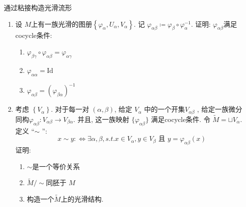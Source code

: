 \documentclass[../main.tex]{subfiles}
\begin{document}
\begin{exercise}{通过粘接构造光滑流形}{}
    \begin{enumerate}
        \item 设 \(  M  \)上有一族光滑的图册\(  \left\{  \varphi _{\alpha },U_{\alpha },V_{ \alpha } \right\}  \). 记 \(   \varphi _{ \alpha \beta }\coloneqq  \varphi _{\beta }\circ  \varphi _{\alpha }^{-1}   \). 证明: \(   \varphi _{\alpha \beta }  \)满足cocycle条件:
        \begin{enumerate}
            \item \(   \varphi _{\beta  \gamma }\circ  \varphi _{\alpha \beta }=  \varphi _{ \alpha  \gamma }  \)
            \item \(   \varphi _{\alpha  \alpha }= \mathrm{Id}  \)
            \item \(   \varphi _{\alpha \beta }= \left(  \varphi _{\beta \alpha } \right)^{-1}    \)   
        \end{enumerate}
        \item 考虑 \(  \left\{ V_{\alpha } \right\}  \). 对于每一对 $(\alpha, \beta)$, 给定 $V_\alpha$ 中的一个开集\(  V_{\alpha \beta }  \) , 给定一族微分同构$\varphi_{\alpha\beta}: V_{\alpha\beta} \to V_{\beta\alpha}$. 并且, 这一族映射 $\{\varphi_{\alpha\beta}\}$ 满足cocycle条件. 令 \(  \tilde{M}=  \sqcup V_{\alpha }  \). 定义 ``\(  \sim   \) '': \[
        x\sim y:\iff \exists \alpha ,\beta , s.t. x\in V_{\alpha }, y \in V_{\beta } \text{ 且 } y=  \varphi _{\alpha \beta }\left( x \right) 
        \]  证明:
        \begin{enumerate}
            \item \(  \sim   \)是一个等价关系
            \item \(  \tilde{M}/\sim   \)同胚于 \(  M  \)
            \item 构造一个\(  \tilde{M}  \)上的光滑结构.    
        \end{enumerate}
        
            
    \end{enumerate}
    
\end{exercise}
\end{document}

